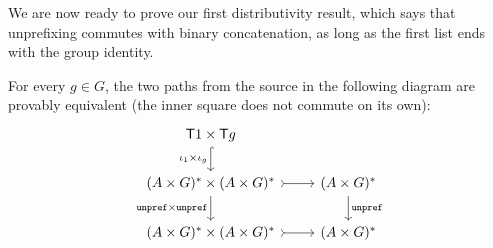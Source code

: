 
We are now ready to prove our first distributivity result, which says that unprefixing commutes with binary concatenation, as long as the first list ends with the group identity. 
\begin{lemma}\label{lem:unprefixing-distributed-binary-concat}
    For every $g \in G$, the two paths from the source in the following diagram are provably equivalent (the inner square does not commute on its own):
    \[
\begin{tikzcd}
\functor \groupid \times \functor g 
\ar[d, hookrightarrow, "\iota_\groupid \times \iota_g"']
\\
(A \times G)^* \times (A \times G)^*
\ar[d, "\unprefterm \times \unprefterm"']
\ar[r,\concar]
& 
(A \times G)^*
\ar[d, "\unprefterm"]
\\
(A \times G)^* \times (A \times G)^*
\ar[r,\concar]
& 
(A \times G)^* 
\end{tikzcd}
\]
\end{lemma}
